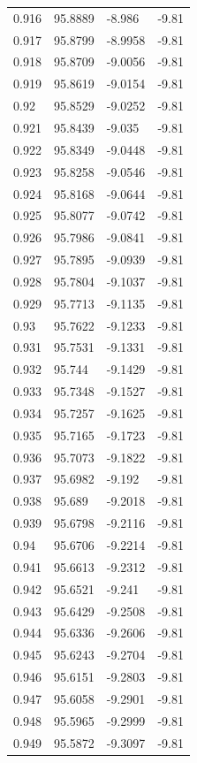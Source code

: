 \begin{tabular}{llll}
0.916 & 95.8889 & -8.986 & -9.81 \\
0.917 & 95.8799 & -8.9958 & -9.81 \\
0.918 & 95.8709 & -9.0056 & -9.81 \\
0.919 & 95.8619 & -9.0154 & -9.81 \\
0.92 & 95.8529 & -9.0252 & -9.81 \\
0.921 & 95.8439 & -9.035 & -9.81 \\
0.922 & 95.8349 & -9.0448 & -9.81 \\
0.923 & 95.8258 & -9.0546 & -9.81 \\
0.924 & 95.8168 & -9.0644 & -9.81 \\
0.925 & 95.8077 & -9.0742 & -9.81 \\
0.926 & 95.7986 & -9.0841 & -9.81 \\
0.927 & 95.7895 & -9.0939 & -9.81 \\
0.928 & 95.7804 & -9.1037 & -9.81 \\
0.929 & 95.7713 & -9.1135 & -9.81 \\
0.93 & 95.7622 & -9.1233 & -9.81 \\
0.931 & 95.7531 & -9.1331 & -9.81 \\
0.932 & 95.744 & -9.1429 & -9.81 \\
0.933 & 95.7348 & -9.1527 & -9.81 \\
0.934 & 95.7257 & -9.1625 & -9.81 \\
0.935 & 95.7165 & -9.1723 & -9.81 \\
0.936 & 95.7073 & -9.1822 & -9.81 \\
0.937 & 95.6982 & -9.192 & -9.81 \\
0.938 & 95.689 & -9.2018 & -9.81 \\
0.939 & 95.6798 & -9.2116 & -9.81 \\
0.94 & 95.6706 & -9.2214 & -9.81 \\
0.941 & 95.6613 & -9.2312 & -9.81 \\
0.942 & 95.6521 & -9.241 & -9.81 \\
0.943 & 95.6429 & -9.2508 & -9.81 \\
0.944 & 95.6336 & -9.2606 & -9.81 \\
0.945 & 95.6243 & -9.2704 & -9.81 \\
0.946 & 95.6151 & -9.2803 & -9.81 \\
0.947 & 95.6058 & -9.2901 & -9.81 \\
0.948 & 95.5965 & -9.2999 & -9.81 \\
0.949 & 95.5872 & -9.3097 & -9.81 \\

\end{tabular}

